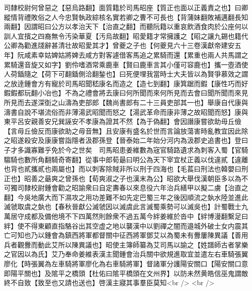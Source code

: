 司隸校尉何曾惡之【惡烏路翻】面質籍於司馬昭座【質正也面以正義責之也】曰卿縱情背禮敗俗之人今忠賢執政綜核名實若卿之曹不可長也【背蒲妹翻敗補邁翻長知兩翻】因謂昭曰公方以孝治天下【治直之翻】而聽阮籍以重哀飲酒食肉於公座何以訓人宜擯之四裔無令汚染華夏【汚烏故翻】昭愛籍才常擁護之【昭之讓九錫也籍代公卿為勸進牋辭甚清壮故昭愛其才】曾夔之子也【何夔見六十三卷漢獻帝建安五年】阮咸素幸姑婢姑將婢去咸方對客遽借客馬追之累騎而還【累重也兩人共馬謂之累騎還音旋又如字】劉伶嗜酒常乘鹿車【賢曰鹿車言其小僅可容鹿也】攜一壺酒使人荷鍤隨之【荷下可翻鍤側洽翻鍫也】曰死便埋我當時士大夫皆以為賢爭慕效之謂之放逹鍾會方有寵於司馬昭聞嵇康名而造之【造七到翻】康箕踞而鍜【康性巧而好鍜鍜都玩翻小冶也】不為之禮會將去康曰何所聞而來何所見而去會曰聞所聞而來見所見而去遂深衘之山濤為吏部郎【魏尚書郎有二十三員吏部其一也】舉康自代康與濤書自說不堪流俗而非薄湯武昭聞而怒之【湯武革命而康非薄之故昭聞而怒】康與東平呂安親善安兄巽誣安不孝康為證其不然【為于偽翻】會因譖康嘗欲助毋丘儉【言毋丘儉反而康欲助之毋音無】且安康有盛名於世而言論放蕩害時亂教宜因此除之昭遂殺安及康康嘗詣隱者汲郡孫登【晉泰始二年始分河内為汲郡史追書也】登曰子才多識寡難乎免於今之世矣　司馬昭患姜維數為宼官騎路遺求為刺客入蜀【官騎騶騎也數所角翻騎奇寄翻】從事中郎荀朂曰明公為天下宰宜杖正義以伐違貳【違離也背也貳攜貳也兩屬也】而以刺客除賊非所以刑于四海也【毛萇曰刑法也韓嬰曰刑正也】昭善之朂爽之曾孫也【荀爽淑之子也漢末為公】昭欲大舉伐漢朝臣多以為不可獨司隸校尉鍾會勸之昭諭衆曰自定夀春以來息役六年治兵繕甲以擬二虜【治直之翻】今吳地廣大而下濕攻之用功差難不如先定巴蜀三年之後因順流之埶水陸並進此滅虢取虞之埶也【春秋晉獻公滅虢因以滅虞此言滅蜀乘勢可以滅吳也】計蜀戰士九萬居守成都及備他境不下四萬然則餘衆不過五萬今絆姜維於沓中【絆博漫翻繫足曰絆】使不得東顧直指駱谷出其空虚之地以襲漢中以劉禪之闇而邉城外破士女内震其亡可知也乃以鍾會為鎮西將軍都督關中征西將軍鄧艾以為蜀未有釁屢陳異議【善用兵者觀釁而動此艾所以陳異議也】昭使主簿師纂為艾司馬以諭之【姓譜師古者掌樂之官因以為氏】艾乃奉命姜維表漢主聞鍾會治兵關中欲規進取宜並遣左右車騎張翼廖化【時張翼為左車騎將軍廖化為右車騎將軍】督諸軍分護陽安關口【陽安關口意即陽平關也】及隂平之橋頭【杜佑曰隂平橋頭在文州界】以防未然黄皓信巫鬼謂敵終不自致【致至也又請也送也】啓漢主寢其事羣臣莫知<br />
<br />
